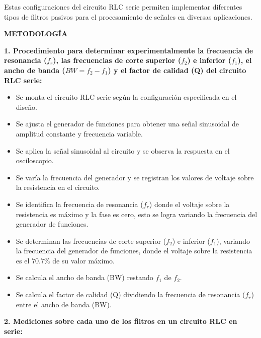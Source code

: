 \documentclass[12pt]{article}
\begin{document}
    Estas configuraciones del circuito RLC serie permiten implementar diferentes tipos de filtros pasivos para el procesamiento de señales en diversas aplicaciones.
    
    \newpage
    
    \begin{center}
        \textbf{\large METODOLOGÍA}\\
    \end{center}
    
    \textbf{1. Procedimiento para determinar experimentalmente la frecuencia de resonancia ($f_{r}$), las frecuencias de corte superior ($f_{2}$) e inferior ($f_{1}$), el ancho de banda ($BW = f_{2}-f_{1}$) y el factor de calidad (Q) del circuito RLC serie:}

    \begin{itemize}
        \item Se monta el circuito RLC serie según la configuración especificada en el diseño.
        \item Se ajusta el generador de funciones para obtener una señal sinusoidal de amplitud constante y frecuencia variable.
        \item Se aplica la señal sinusoidal al circuito y se observa la respuesta en el osciloscopio.
        \item Se varía la frecuencia del generador y se registran los valores de voltaje sobre la resistencia en el circuito.
        \item Se identifica la frecuencia de resonancia ($f_{r}$) donde el voltaje sobre la resistencia es máximo y la fase es cero, esto se logra variando la frecuencia del generador de funciones.
        \item Se determinan las frecuencias de corte superior ($f_{2}$) e inferior ($f_{1}$), variando la frecuencia del generador de funciones, donde el voltaje sobre la resistencia es el 70.7\% de su valor máximo.
        \item Se calcula el ancho de banda (BW) restando $f_{1}$ de $f_{2}$.
        \item Se calcula el factor de calidad (Q) dividiendo la frecuencia de resonancia ($f_{r}$) entre el ancho de banda (BW).
    \end{itemize}
    
    \textbf{2. Mediciones sobre cada uno de los filtros en un circuito RLC en serie:}
\end{document}

